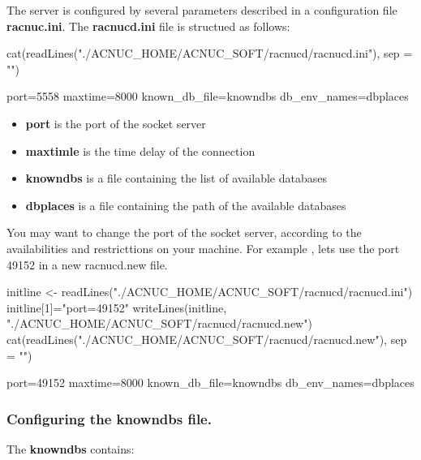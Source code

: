 \documentclass{article}
\begin{document}
The server is configured by several parameters described in a configuration file \textbf{racnuc.ini}.
The \textbf{racnucd.ini} file is structued as follows:


\begin{Schunk}
\begin{Sinput}
 cat(readLines("./ACNUC_HOME/ACNUC_SOFT/racnucd/racnucd.ini"), sep = "\n")
\end{Sinput}
\begin{Soutput}
port=5558
maxtime=8000
known_db_file=knowndbs
db_env_names=dbplaces
\end{Soutput}
\end{Schunk}

\begin{itemize}
\item \textbf{port} is the port of the socket server 
\item \textbf{maxtimle} is the time delay of the connection
\item \textbf{knowndbs} is a file containing the list of available databases
\item \textbf{dbplaces} is a file containing the path of the available databases
\end{itemize}



You may want to change the port of the socket server, according to the availabilities and restricttions on your machine.
For example , lets use the port 49152 in a new racnucd.new file.

\begin{Schunk}
\begin{Sinput}
 initline <- readLines("./ACNUC_HOME/ACNUC_SOFT/racnucd/racnucd.ini")
 initline[1]="port=49152"
 writeLines(initline, "./ACNUC_HOME/ACNUC_SOFT/racnucd/racnucd.new")
 cat(readLines("./ACNUC_HOME/ACNUC_SOFT/racnucd/racnucd.new"), sep = "\n")
\end{Sinput}
\begin{Soutput}
port=49152
maxtime=8000
known_db_file=knowndbs
db_env_names=dbplaces
\end{Soutput}
\end{Schunk}

 
\subsubsection{Configuring the knowndbs file.}

The \textbf{knowndbs} contains:
\end{document}
